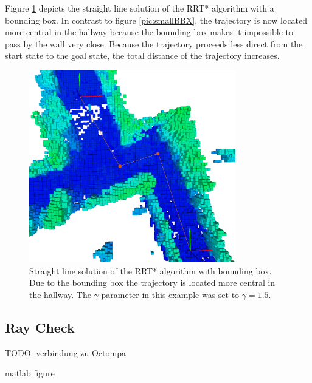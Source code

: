 Figure \ref{pic:bbx} depicts the straight line solution of the RRT* algorithm with a bounding box. In contrast to figure \ref{pic:smallBBX}, the trajectory is now located more central in the hallway because the bounding box makes it impossible to pass by the wall very close. Because the trajectory proceeds less direct from the start state to the goal state, the total distance of the trajectory increases. 

\begin{figure}[H]
   \centering
   \includegraphics[trim = 50mm 0mm 30mm 0mm,clip,width=0.8\textwidth]{pics/largeBBXP.png}
   \caption{Straight line solution of the RRT* algorithm with bounding box. Due to the bounding box the trajectory is located more central in the hallway. The $\gamma$ parameter in this example was set to $\gamma = 1.5$.}
   \label{pic:bbx}
\end{figure}

\subsection{Ray Check}

 TODO: verbindung zu Octompa
 
 matlab figure






%
%
%
%
%
